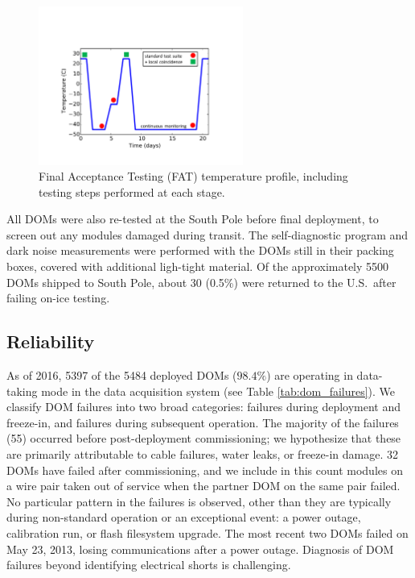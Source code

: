 
\begin{figure}[!h]
 \centering
 \includegraphics[width=0.6\textwidth]{graphics/dom/production/fat_cycle.pdf}
 \caption{Final Acceptance Testing (FAT) temperature profile, including
   testing steps performed at each stage.}
 \label{fig:fat_cycle}
\end{figure}

All DOMs were also re-tested at the South Pole before final deployment, to
screen out any modules damaged during transit.  The self-diagnostic
program and dark noise measurements were performed with the DOMs still in
their packing boxes, covered with additional ligh-tight material.  Of the
approximately 5500 DOMs shipped to South Pole, about 30 (0.5\%) were
returned to the U.S.~after failing on-ice testing.    

\subsection{\label{sec:reliability}Reliability}

As of 2016, 5397 of the 5484 deployed DOMs ($98.4\%$) are operating in
data-taking mode in the data acquisition system (see Table
\ref{tab:dom_failures}).  We classify DOM 
failures into two broad categories: failures during deployment and
freeze-in, and failures during subsequent operation.  The majority of the
failures (55) occurred before post-deployment commissioning; we hypothesize
that these are primarily attributable to cable failures, water leaks,
or freeze-in damage. 32 DOMs have failed after commissioning, and
we include in this count modules on a wire pair taken out of service when
the partner DOM on the same pair failed.  No particular pattern in the
failures is observed, other than they are typically during non-standard
operation or an exceptional event: a power outage, calibration run, or
flash filesystem upgrade.  The most recent two DOMs failed on May 23, 2013,
losing communications after a power outage.  Diagnosis of DOM failures
beyond identifying electrical shorts is challenging.

